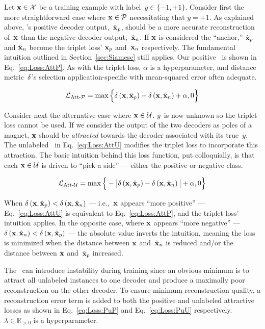 Let $\mathbf{x}\in\mathcal{X}$ be a training example with label~${y\in\{-1,+1\}}$. Consider first the more straightforward case where ${\mathbf{x}\in\mathcal{P}}$ necessitating that ${y=+1}$.  As explained above, \toolname's positive decoder output,~$\hat{\mathbf{x}}_{p}$, should be a more accurate reconstruction of~$\mathbf{x}$ than the negative decoder output,~$\hat{\mathbf{x}}_{n}$. If $\mathbf{x}$ is considered the ``anchor,'' $\hat{\mathbf{x}}_{p}$ and $\hat{\mathbf{x}}_{n}$ become the triplet loss' $\mathbf{x}_{p}$ and~$\mathbf{x}_{n}$ respectively. The fundamental intuition outlined in Section~\ref{sec:Siamese} still applies.  Our positive \attLossLow\ is shown in Eq.~\eqref{eq:Loss:AttP}.  As with the triplet loss, $\alpha$ is a hyperparameter, and distance metric~$\delta$'s selection application-specific with mean-squared error often adequate.

\begin{equation}\label{eq:Loss:AttP}
  \mathcal{L}_{\text{Att-}\mathcal{P}} = \max\Big\{ \delta\left(\mathbf{x}, \hat{\mathbf{x}}_{p}\right) - \delta\left(\mathbf{x}, \hat{\mathbf{x}}_{n}\right) + \alpha, 0 \Big\}
\end{equation}

Consider next the alternative case where ${\mathbf{x}\in\mathcal{U}}$. $y$~is now unknown so the triplet loss cannot be used.  If we consider the output of the two decoders as poles of a magnet, $\mathbf{x}$ should be \textit{attracted} towards the decoder associated with its true~$y$. The unlabeled \attLossLow\ in Eq.~\ref{eq:Loss:AttU} modifies the triplet loss to incorporate this attraction.  The basic intuition behind this loss function, put colloquially, is that each ${\mathbf{x}\in\mathcal{U}}$ is driven to ``pick a side'' --- either the positive or negative class.

\begin{equation}\label{eq:Loss:AttU}
  \mathcal{L}_{\text{Att-}\mathcal{U}} = \max\Big\{ - \big\lvert\delta\left(\mathbf{x}, \hat{\mathbf{x}}_{p}\right) - \delta\left(\mathbf{x}, \hat{\mathbf{x}}_{n}\right)\big\rvert + \alpha, 0 \Big\}
\end{equation}

When ${\delta\left(\mathbf{x}, \hat{\mathbf{x}}_{p}\right) < \delta\left(\mathbf{x}, \hat{\mathbf{x}}_{n}\right)}$ --- i.e.,~$\mathbf{x}$ appears ``more positive'' --- Eq.~\eqref{eq:Loss:AttU} is equivalent to Eq.~\eqref{eq:Loss:AttP}, and the triplet loss' intuition applies. In the opposite case, where $\mathbf{x}$ appears ``more negative'' --- ${\delta\left(\mathbf{x}, \hat{\mathbf{x}}_{n}\right) < \delta\left(\mathbf{x}, \hat{\mathbf{x}}_{p}\right)}$ --- the absolute value inverts the intuition, meaning the loss is minimized when the distance between $\mathbf{x}$ and~$\hat{\mathbf{x}}_{n}$ is reduced and/or the distance between $\mathbf{x}$ and~$\hat{\mathbf{x}}_{p}$ increased.

The \attLossLow\ can introduce instability during training since an obvious minimum is to attract all unlabeled instances to one decoder and produce a maximally poor reconstruction on the other decoder.  To ensure minimum reconstruction quality, a reconstruction error term is added to both the positive and unlabeled attractive losses as shown in Eq.~\eqref{eq:Loss:PuP} and Eq.~\eqref{eq:Loss:PuU} respectively. ${\lambda\in\mathbb{R}_{{>}0}}$ is a hyperparameter.

